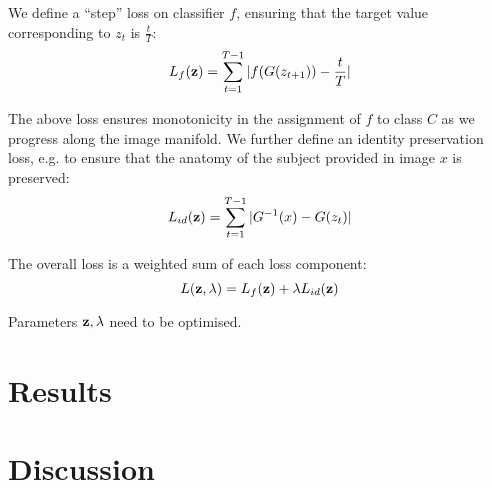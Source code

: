 \documentclass{article}
\begin{document}
We define a ``step'' loss on classifier $f$, ensuring that the target value corresponding to $z_{t}$ is $\frac{t}{T}$: 
\begin{equation}
L_f(\textbf{z}) = \sum_{t=1}^{T-1} |f(G(z_{t+1})) - \frac{t}{T}| 
\end{equation}

The above loss ensures monotonicity in the assignment of $f$ to class $C$ as we progress along the image manifold. We further define an identity preservation loss, e.g. to ensure that the anatomy of the subject provided in image $x$ is preserved:
\begin{equation}
L_{id}(\textbf{z}) = \sum_{t=1}^{T-1} |G^{-1}(x) - G(z_t)| 
\end{equation}

The overall loss is a weighted sum of each loss component:
\begin{equation}
L(\textbf{z}, \lambda) = L_f(\textbf{z}) + \lambda L_{id}(\textbf{z}) 
\end{equation}

Parameters $\textbf{z}, \lambda$ need to be optimised.

\section{Results}

\section{Discussion}









% 
% 
% 
\end{document}
